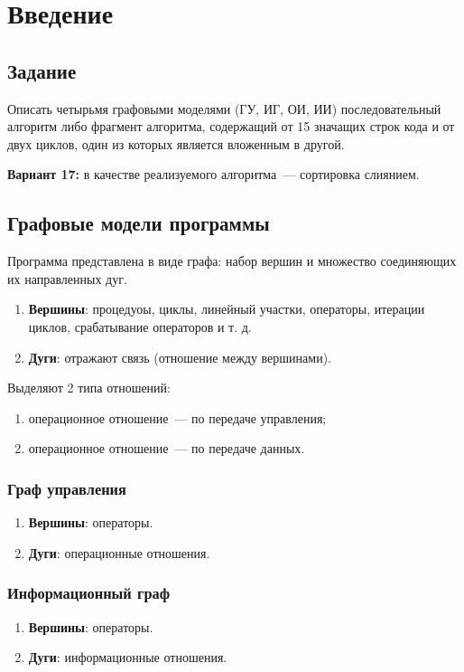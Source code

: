 \chapter{Введение}

\section{Задание}

Описать четырьмя графовыми моделями (ГУ, ИГ, ОИ, ИИ) последовательный алгоритм либо фрагмент алгоритма, содержащий от 15 значащих строк кода и от двух циклов, один из которых является вложенным в другой.

\textbf{Вариант 17:} в качестве реализуемого алгоритма~--- сортировка слиянием.

\section{Графовые модели программы}

Программа представлена в виде графа: набор вершин и множество соединяющих их направленных дуг.

\begin{enumerate}
    \item \textbf{Вершины}: процедуоы, циклы, линейный участки, операторы, итерации циклов, срабатывание операторов и т. д.
    \item \textbf{Дуги}: отражают связь (отношение между вершинами). 
\end{enumerate}

Выделяют 2 типа отношений:
\begin{enumerate}
    \item операционное отношение~--- по передаче управления;
    \item операционное отношение~--- по передаче данных.
\end{enumerate}

\subsection*{Граф управления}
\begin{enumerate}
    \item \textbf{Вершины}: операторы.
    \item \textbf{Дуги}: операционные отношения.
\end{enumerate}

\subsection*{Информационный граф}
\begin{enumerate}
    \item \textbf{Вершины}: операторы.
    \item \textbf{Дуги}: информационные отношения.
\end{enumerate}

